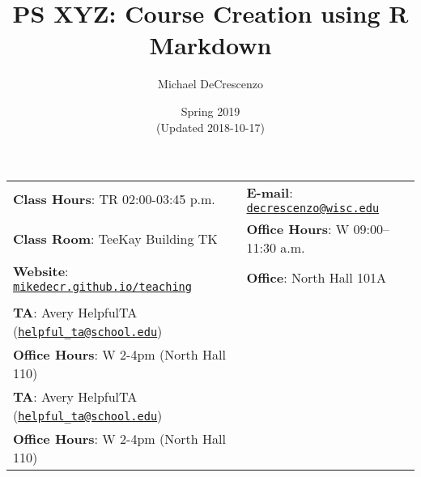 \documentclass[
      12pt,
        ]{article}
\title{PS XYZ: Course Creation using R Markdown}
\author{Michael DeCrescenzo}
\date{Spring 2019 
       \\[6pt] \normalsize (Updated 2018-10-17) }
\begin{document}
  

  \maketitle
  
 
\thispagestyle{firststyle}



\begin{tabular*}{\textwidth}{ @{\extracolsep{\fill}} ll @{\extracolsep{\fill}}}

  \textbf{Class Hours}: TR 02:00-03:45 p.m. &
    \textbf{E-mail}: \texttt{\href{mailto:decrescenzo@wisc.edu}{\nolinkurl{decrescenzo@wisc.edu}}} \\

  \textbf{Class Room}: TeeKay Building TK &
    \textbf{Office Hours}: W 09:00--11:30 a.m. \\

  \textbf{Website}: \href{http://mikedecr.github.io/teaching}{\tt mikedecr.github.io/teaching} &
    \textbf{Office}: North Hall 101A \\

    

      \\[3pt]
    \textbf{TA}: Avery HelpfulTA
                 (\texttt{\href{mailto:helpful_ta@school.edu}{\nolinkurl{helpful\_ta@school.edu}}})
                  \\ \textbf{Office Hours}: W 2-4pm 
                  (North Hall 110)
      \\[3pt]
    \textbf{TA}: Avery HelpfulTA
                 (\texttt{\href{mailto:helpful_ta@school.edu}{\nolinkurl{helpful\_ta@school.edu}}})
                  \\ \textbf{Office Hours}: W 2-4pm 
                  (North Hall 110)


 \end{tabular*}
 
\vspace{2mm}

\end{document}
